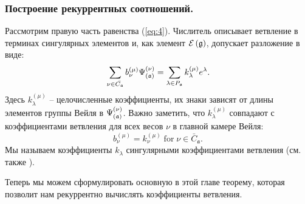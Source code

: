 \subsubsection{Построение рекуррентных соотношений.}
\label{subsec:Construct-recurrent-rel}

Рассмотрим правую часть равенства (\ref{eq:4}).
Числитель описывает ветвление в терминах сингулярных элементов и, как элемент  $\mathcal{E}\left( \mathfrak{g} \right)$, допускает разложение в виде:
\begin{equation}
  \label{eq:21}
  \sum_{\nu \in \bar{C_{\mathfrak{a}}}}b_{\nu }^{\left( \mu \right) }\Psi _{\left( \frak{%
        a}\right) }^{\left( \nu \right) }=\sum_{\lambda \in P_{\af}}k_{\lambda
  }^{\left( \mu \right) }e^{\lambda }.
\end{equation}
Здесь $k_{\lambda}^{\left( \mu \right) }$  -- целочисленные коэффициенты, их знаки зависят от длины элементов группы Вейля в 
$\Psi _{\left( \mathfrak{a}\right) }^{\left( \nu \right) }$. Важно заметить, что $k_{\lambda}^{\left( \mu \right) }$ совпадают с коэффициентами ветвления для всех весов $\nu$ в главной камере Вейля:
\begin{equation}
  b^{(\mu)}_{\nu}=k^{(\mu)}_{\nu} \; \mbox{for} \; \nu\in \bar{C}_{\mathfrak{a}}.
\label{eq:21-1}
\end{equation}
Мы называем коэффициенты $k_{\lambda}$ сингулярными коэффициентами ветвления
(см. также \cite{ilyin812pbc}).

Теперь мы можем сформулировать основную в этой главе теорему, которая позволит нам рекуррентно вычислять коэффициенты ветвления.


